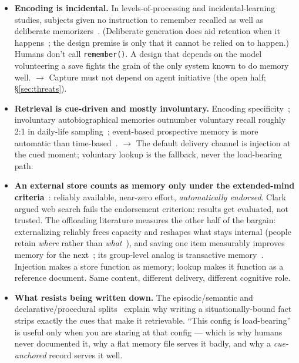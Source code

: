 \documentclass[11pt]{article}
\begin{document}
\begin{itemize}
\item \textbf{Encoding is incidental.} In levels-of-processing and
  incidental-learning studies, subjects given no instruction to remember
  recalled as well as deliberate memorizers~\cite{craik,hyde}. (Deliberate
  generation does aid retention when it happens~\cite{slamecka}; the design
  premise is only that it cannot be relied on to happen.) Humans don't
  call \texttt{remember()}. A design that depends on the model volunteering a
  save fights the grain of the only system known to do memory well.
  $\rightarrow$ Capture must not depend on agent initiative (the open half; \S\ref{sec:threats}).
\item \textbf{Retrieval is cue-driven and mostly involuntary.} Encoding
  specificity~\cite{tulvingthomson}; involuntary autobiographical memories outnumber
  voluntary recall roughly 2:1 in daily-life sampling~\cite{berntsen};
  event-based prospective memory is more automatic than time-based~\cite{mcdaniel}.
  $\rightarrow$ The default delivery channel is injection at the cued moment; voluntary
  lookup is the fallback, never the load-bearing path.
\item \textbf{An external store counts as memory only under the extended-mind
  criteria}~\cite{clark}: reliably available, near-zero effort, \emph{automatically
  endorsed}. Clark argued web search fails the endorsement criterion:
  results get evaluated, not trusted. The offloading literature
  measures the other half of the bargain: externalizing reliably frees
  capacity and reshapes what stays internal (people retain \emph{where}
  rather than \emph{what}~\cite{risko,sparrow}), and saving one item measurably improves
  memory for the next~\cite{storm}; its group-level analog is transactive
  memory~\cite{wegner}. Injection makes a store function as memory; lookup makes
  it function as a reference document. Same content, different
  delivery, different cognitive role.
\item \textbf{What resists being written down.} The episodic/semantic and
  declarative/procedural splits~\cite{tulving,squire} explain why writing a
  situationally-bound fact strips exactly the cues that make it
  retrievable. ``This config is load-bearing'' is useful only when you are
  staring at that config --- which is why humans never documented it, why
  a flat memory file serves it badly, and why a \emph{cue-anchored} record
  serves it well.
\end{itemize}
\end{document}
